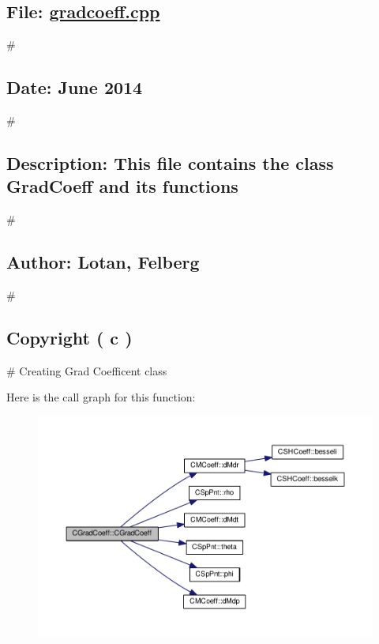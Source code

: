\subsection*{File\-: \hyperlink{gradcoeff_8cpp}{gradcoeff.\-cpp}}

\# \subsection*{Date\-: June 2014}

\# \subsection*{Description\-: This file contains the class Grad\-Coeff and its functions}

\# \subsection*{Author\-: Lotan, Felberg}

\# \subsection*{Copyright ( c )}

\# Creating Grad Coefficent class 

Here is the call graph for this function\-:\nopagebreak
\begin{figure}[H]
\begin{center}
\leavevmode
\includegraphics[width=350pt]{classCGradCoeff_a41d80b3998f3dfe2a9111ab9f00855fb_cgraph}
\end{center}
\end{figure}




